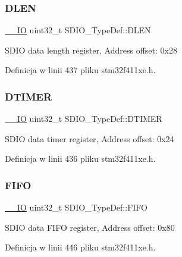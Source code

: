 \subsubsection{\texorpdfstring{D\+L\+EN}{DLEN}}
{\footnotesize\ttfamily \hyperlink{core__sc300_8h_aec43007d9998a0a0e01faede4133d6be}{\+\_\+\+\_\+\+IO} uint32\+\_\+t S\+D\+I\+O\+\_\+\+Type\+Def\+::\+D\+L\+EN}

S\+D\+IO data length register, Address offset\+: 0x28 

Definicja w linii 437 pliku stm32f411xe.\+h.

\mbox{\label{struct_s_d_i_o___type_def_a5af1984c7c00890598ca74fc85449f9f}} 
\subsubsection{\texorpdfstring{D\+T\+I\+M\+ER}{DTIMER}}
{\footnotesize\ttfamily \hyperlink{core__sc300_8h_aec43007d9998a0a0e01faede4133d6be}{\+\_\+\+\_\+\+IO} uint32\+\_\+t S\+D\+I\+O\+\_\+\+Type\+Def\+::\+D\+T\+I\+M\+ER}

S\+D\+IO data timer register, Address offset\+: 0x24 

Definicja w linii 436 pliku stm32f411xe.\+h.

\mbox{\label{struct_s_d_i_o___type_def_ab4757027388ea3a0a6f114d7de2ed4cf}} 
\subsubsection{\texorpdfstring{F\+I\+FO}{FIFO}}
{\footnotesize\ttfamily \hyperlink{core__sc300_8h_aec43007d9998a0a0e01faede4133d6be}{\+\_\+\+\_\+\+IO} uint32\+\_\+t S\+D\+I\+O\+\_\+\+Type\+Def\+::\+F\+I\+FO}

S\+D\+IO data F\+I\+FO register, Address offset\+: 0x80 

Definicja w linii 446 pliku stm32f411xe.\+h.

\mbox{\label{struct_s_d_i_o___type_def_a463869ee8a7e62724f284e42d26aff7f}} 

